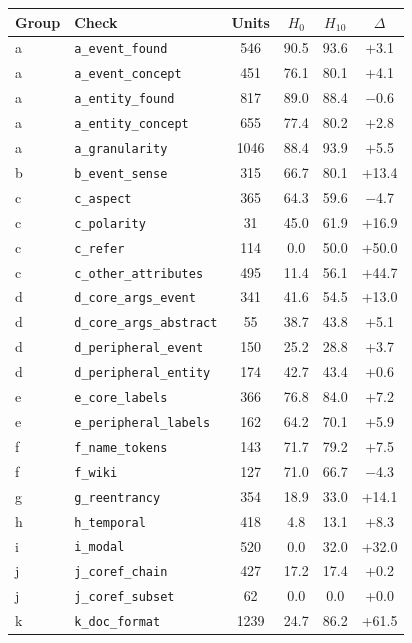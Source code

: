 \begin{tabular}{@{}llcccc@{}}
\toprule
Group & Check & Units & $H_0$ & $H_{10}$ & $\Delta$ \\
\midrule
a & \texttt{a\_event\_found} & 546 & 90.5 & 93.6 & +3.1 \\
a & \texttt{a\_event\_concept} & 451 & 76.1 & 80.1 & +4.1 \\
a & \texttt{a\_entity\_found} & 817 & 89.0 & 88.4 & $-$0.6 \\
a & \texttt{a\_entity\_concept} & 655 & 77.4 & 80.2 & +2.8 \\
a & \texttt{a\_granularity} & 1046 & 88.4 & 93.9 & +5.5 \\
b & \texttt{b\_event\_sense} & 315 & 66.7 & 80.1 & +13.4 \\
c & \texttt{c\_aspect} & 365 & 64.3 & 59.6 & $-$4.7 \\
c & \texttt{c\_polarity} & 31 & 45.0 & 61.9 & +16.9 \\
c & \texttt{c\_refer} & 114 & 0.0 & 50.0 & +50.0 \\
c & \texttt{c\_other\_attributes} & 495 & 11.4 & 56.1 & +44.7 \\
d & \texttt{d\_core\_args\_event} & 341 & 41.6 & 54.5 & +13.0 \\
d & \texttt{d\_core\_args\_abstract} & 55 & 38.7 & 43.8 & +5.1 \\
d & \texttt{d\_peripheral\_event} & 150 & 25.2 & 28.8 & +3.7 \\
d & \texttt{d\_peripheral\_entity} & 174 & 42.7 & 43.4 & +0.6 \\
e & \texttt{e\_core\_labels} & 366 & 76.8 & 84.0 & +7.2 \\
e & \texttt{e\_peripheral\_labels} & 162 & 64.2 & 70.1 & +5.9 \\
f & \texttt{f\_name\_tokens} & 143 & 71.7 & 79.2 & +7.5 \\
f & \texttt{f\_wiki} & 127 & 71.0 & 66.7 & $-$4.3 \\
g & \texttt{g\_reentrancy} & 354 & 18.9 & 33.0 & +14.1 \\
h & \texttt{h\_temporal} & 418 & 4.8 & 13.1 & +8.3 \\
i & \texttt{i\_modal} & 520 & 0.0 & 32.0 & +32.0 \\
j & \texttt{j\_coref\_chain} & 427 & 17.2 & 17.4 & +0.2 \\
j & \texttt{j\_coref\_subset} & 62 & 0.0 & 0.0 & +0.0 \\
k & \texttt{k\_doc\_format} & 1239 & 24.7 & 86.2 & +61.5 \\
\bottomrule
\end{tabular}
